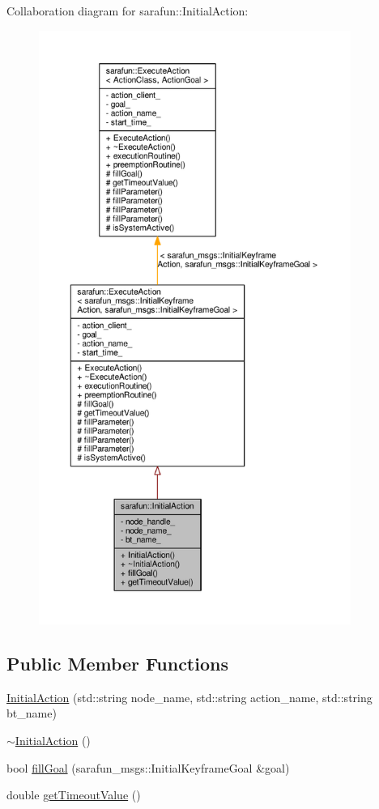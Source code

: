 Collaboration diagram for sarafun\-:\-:Initial\-Action\-:\nopagebreak
\begin{figure}[H]
\begin{center}
\leavevmode
\includegraphics[height=550pt]{da/d64/classsarafun_1_1InitialAction__coll__graph}
\end{center}
\end{figure}
\subsection*{Public Member Functions}
\begin{DoxyCompactItemize}
\item 
\hyperlink{classsarafun_1_1InitialAction_afecd855fe18671ea36bdab881603e8bc_afecd855fe18671ea36bdab881603e8bc}{Initial\-Action} (std\-::string node\-\_\-name, std\-::string action\-\_\-name, std\-::string bt\-\_\-name)
\item 
\hyperlink{classsarafun_1_1InitialAction_af1f0a71513d093f5c2d7657b4b84661b_af1f0a71513d093f5c2d7657b4b84661b}{$\sim$\-Initial\-Action} ()
\item 
bool \hyperlink{classsarafun_1_1InitialAction_aac7f439c30455349e075e91542565a43_aac7f439c30455349e075e91542565a43}{fill\-Goal} (sarafun\-\_\-msgs\-::\-Initial\-Keyframe\-Goal \&goal)
\item 
double \hyperlink{classsarafun_1_1InitialAction_a1b58c06c32ec9f9d3e75c37de5e7d2c8_a1b58c06c32ec9f9d3e75c37de5e7d2c8}{get\-Timeout\-Value} ()
\end{DoxyCompactItemize}
